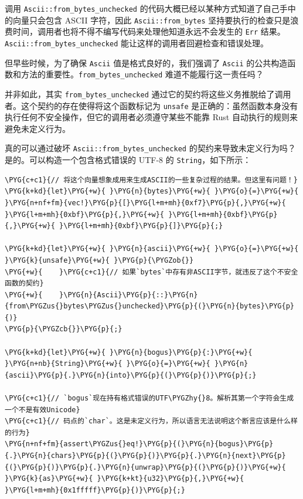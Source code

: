 调用 \texttt{Ascii::from\_bytes\_unchecked} 的代码大概已经以某种方式知道了自己手中的向量只会包含 ASCII 字符，因此 \texttt{Ascii::from\_bytes} 坚持要执行的检查只是浪费时间，调用者也将不得不编写代码来处理他知道永远不会发生的 \texttt{Err} 结果。\texttt{Ascii::from\_bytes\_unchecked} 能让这样的调用者回避检查和错误处理。

但早些时候，为了确保 \texttt{Ascii} 值是格式良好的，我们强调了 \texttt{Ascii} 的公共构造函数和方法的重要性。\texttt{from\_bytes\_unchecked} 难道不能履行这一责任吗？

并非如此，其实 \texttt{from\_bytes\_unchecked} 通过它的契约将这些义务推脱给了调用者。这个契约的存在使得将这个函数标记为 \texttt{unsafe} 是正确的：虽然函数本身没有执行任何不安全操作，但它的调用者必须遵守某些不能靠 Rust 自动执行的规则来避免未定义行为。

真的可以通过破坏 \texttt{Ascii::from\_bytes\_unchecked} 的契约来导致未定义行为吗？是的。可以构造一个包含格式错误的 UTF-8 的 \texttt{String}，如下所示：

\begin{Verbatim}[commandchars=\\\{\},breaklines=true,breakanywhere=true,fontsize=\codefont,xleftmargin=17bp]
\PYG{c+c1}{// 将这个向量想象成用来生成ASCII的一些复杂过程的结果。但这里有问题！}
\PYG{k+kd}{let}\PYG{+w}{ }\PYG{n}{bytes}\PYG{+w}{ }\PYG{o}{=}\PYG{+w}{ }\PYG{n+nf+fm}{vec!}\PYG{p}{[}\PYG{l+m+mh}{0xf7}\PYG{p}{,}\PYG{+w}{ }\PYG{l+m+mh}{0xbf}\PYG{p}{,}\PYG{+w}{ }\PYG{l+m+mh}{0xbf}\PYG{p}{,}\PYG{+w}{ }\PYG{l+m+mh}{0xbf}\PYG{p}{]}\PYG{p}{;}

\PYG{k+kd}{let}\PYG{+w}{ }\PYG{n}{ascii}\PYG{+w}{ }\PYG{o}{=}\PYG{+w}{ }\PYG{k}{unsafe}\PYG{+w}{ }\PYG{p}{\PYGZob{}}
\PYG{+w}{    }\PYG{c+c1}{// 如果`bytes`中存有非ASCII字节，就违反了这个不安全函数的契约}
\PYG{+w}{    }\PYG{n}{Ascii}\PYG{p}{::}\PYG{n}{from\PYGZus{}bytes\PYGZus{}unchecked}\PYG{p}{(}\PYG{n}{bytes}\PYG{p}{)}
\PYG{p}{\PYGZcb{}}\PYG{p}{;}

\PYG{k+kd}{let}\PYG{+w}{ }\PYG{n}{bogus}\PYG{p}{:}\PYG{+w}{ }\PYG{n+nb}{String}\PYG{+w}{ }\PYG{o}{=}\PYG{+w}{ }\PYG{n}{ascii}\PYG{p}{.}\PYG{n}{into}\PYG{p}{(}\PYG{p}{)}\PYG{p}{;}

\PYG{c+c1}{// `bogus`现在持有格式错误的UTF\PYGZhy{}8。解析其第一个字符会生成一个不是有效Unicode}
\PYG{c+c1}{// 码点的`char`。这是未定义行为，所以语言无法说明这个断言应该是什么样的行为}
\PYG{n+nf+fm}{assert\PYGZus{}eq!}\PYG{p}{(}\PYG{n}{bogus}\PYG{p}{.}\PYG{n}{chars}\PYG{p}{(}\PYG{p}{)}\PYG{p}{.}\PYG{n}{next}\PYG{p}{(}\PYG{p}{)}\PYG{p}{.}\PYG{n}{unwrap}\PYG{p}{(}\PYG{p}{)}\PYG{+w}{ }\PYG{k}{as}\PYG{+w}{ }\PYG{k+kt}{u32}\PYG{p}{,}\PYG{+w}{ }\PYG{l+m+mh}{0x1fffff}\PYG{p}{)}\PYG{p}{;}
\end{Verbatim}

